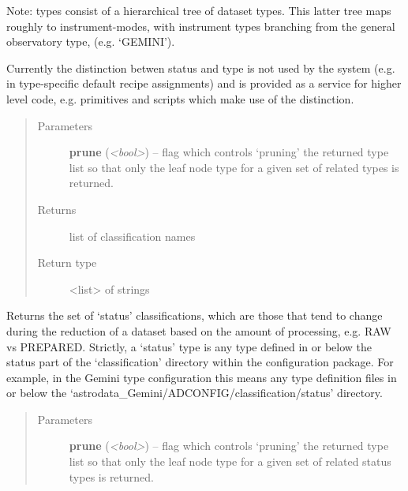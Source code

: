 \documentclass[letterpaper,10pt,english]{sphinxmanual}
\begin{document}
\begin{fulllineitems}
\begin{fulllineitems}
Note: types consist of a hierarchical tree of dataset types.
This latter tree maps roughly to instrument-modes, with instrument 
types branching from the general observatory type, (e.g. `GEMINI').

Currently the distinction betwen status and type is not used by the
system (e.g. in type-specific default recipe assignments) and is
provided as a service for higher level code, e.g. primitives and
scripts which make use of the distinction.
\begin{quote}\begin{description}
\item[{Parameters}] \leavevmode
\textbf{prune} (\emph{\textless{}bool\textgreater{}}) -- flag which controls `pruning' the returned type list 
so that only the leaf node type for a given set of 
related types is returned.

\item[{Returns}] \leavevmode
list of classification names

\item[{Return type}] \leavevmode
\textless{}list\textgreater{} of strings

\end{description}\end{quote}

\end{fulllineitems}


\begin{fulllineitems}
\label{astro_class:astrodata.AstroData.AstroData.status}
Returns the set of `status' classifications, which are those that 
tend to change during the reduction of a dataset based on 
the amount of processing, e.g. RAW vs PREPARED.  Strictly, a `status' 
type is any type defined in or below the status part of the 
`classification' directory within the configuration package. For 
example, in the Gemini type configuration this means any type definition
files in or below the `astrodata\_Gemini/ADCONFIG/classification/status'
directory.
\begin{quote}\begin{description}
\item[{Parameters}] \leavevmode
\textbf{prune} (\emph{\textless{}bool\textgreater{}}) -- flag which controls `pruning' the returned type list 
so that only the leaf node type for a given set of 
related status types is returned.


\end{description}
\end{quote}
\end{fulllineitems}
\end{fulllineitems}
\end{document}

